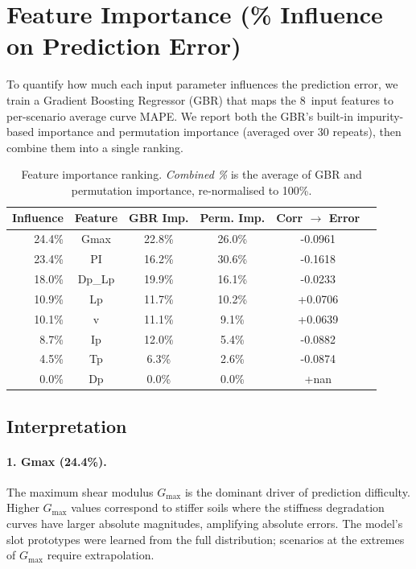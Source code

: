 \documentclass[11pt,a4paper]{article}
\begin{document}
\section{Feature Importance (\% Influence on Prediction Error)}
\label{sec:importance}

To quantify how much each input parameter influences the prediction error, we
train a Gradient Boosting Regressor (GBR) that maps the 8~input features to
per-scenario average curve MAPE.  We report both the GBR's built-in impurity-based
importance and permutation importance (averaged over 30 repeats), then combine
them into a single ranking.

\begin{table}[h]
\centering
\caption{Feature importance ranking. \emph{Combined \%} is the average of
GBR and permutation importance, re-normalised to 100\%.}
\begin{tabular}{rccccc}
\toprule
\textbf{Influence} & \textbf{Feature} & \textbf{GBR Imp.} &
\textbf{Perm. Imp.} & \textbf{Corr $\to$ Error} \\
\midrule
    24.4\% & Gmax & 22.8\% & 26.0\% & -0.0961 \\
    23.4\% & PI & 16.2\% & 30.6\% & -0.1618 \\
    18.0\% & Dp_Lp & 19.9\% & 16.1\% & -0.0233 \\
    10.9\% & Lp & 11.7\% & 10.2\% & +0.0706 \\
    10.1\% & v & 11.1\% & 9.1\% & +0.0639 \\
    8.7\% & Ip & 12.0\% & 5.4\% & -0.0882 \\
    4.5\% & Tp & 6.3\% & 2.6\% & -0.0874 \\
    0.0\% & Dp & 0.0\% & 0.0\% & +nan \\
\bottomrule
\end{tabular}
\label{tab:importance}
\end{table}

\subsection{Interpretation}

\paragraph{1. Gmax (24.4\%).}
The maximum shear modulus $G_{\max}$ is the dominant driver of prediction difficulty. Higher $G_{\max}$ values correspond to stiffer soils where the stiffness degradation curves have larger absolute magnitudes, amplifying absolute errors.  The model's slot prototypes were learned from the full distribution; scenarios at the extremes of $G_{\max}$ require extrapolation.
\end{document}
